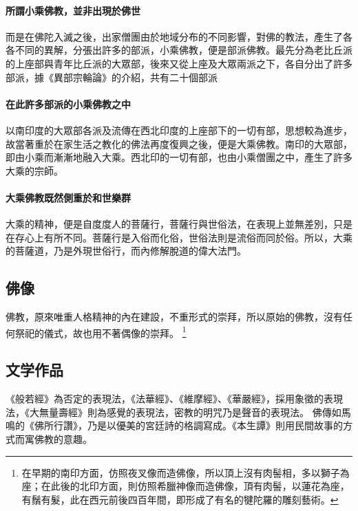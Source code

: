\paragraph{所謂小乘佛教，並非出現於佛世} 而是在佛陀入滅之後，出家僧團由於地域分布的不同影響，對佛的教法，產生了各各不同的異解，分張出許多的部派，小乘佛教，便是部派佛教。最先分為老比丘派的上座部與青年比丘派的大眾部，後來又從上座及大眾兩派之下，各自分出了許多部派，據《異部宗輪論》的介紹，共有二十個部派
\paragraph{在此許多部派的小乘佛教之中}以南印度的大眾部各派及流傳在西北印度的上座部下的一切有部，思想較為進步，故當著重於在家生活之教化的佛法再度復興之後，便是大乘佛教。南印的大眾部，即由小乘而漸漸地融入大乘。西北印的一切有部，也由小乘僧團之中，產生了許多大乘的宗師。
\paragraph{大乘佛教既然側重於和世樂群}大乘的精神，便是自度度人的菩薩行，菩薩行與世俗法，在表現上並無差別，只是在存心上有所不同。菩薩行是入俗而化俗，世俗法則是流俗而同於俗。所以，大乘的菩薩道，乃是外現世俗行，而內修解脫道的偉大法門。

\subsection{佛像}
佛教，原來唯重人格精神的內在建設，不重形式的崇拜，所以原始的佛教，沒有任何祭祀的儀式，故也用不著偶像的崇拜。
\footnote{在早期的南印方面，仿照夜叉像而造佛像，所以頂上沒有肉髻相，多以獅子為座；在此後的北印方面，則仿照希臘神像而造佛像，頂有肉髻，以蓮花為座，有鬚有髮，此在西元前後四百年間，即形成了有名的犍陀羅的雕刻藝術。}

\subsection{文学作品}
《般若經》為否定的表現法，《法華經》、《維摩經》、《華嚴經》，採用象徵的表現法，《大無量壽經》則為感覺的表現法，密教的明咒乃是聲音的表現法。
佛傳如馬鳴的《佛所行讚》，乃是以優美的宮廷詩的格調寫成。《本生譚》則用民間故事的方式而寓佛教的意趣。
